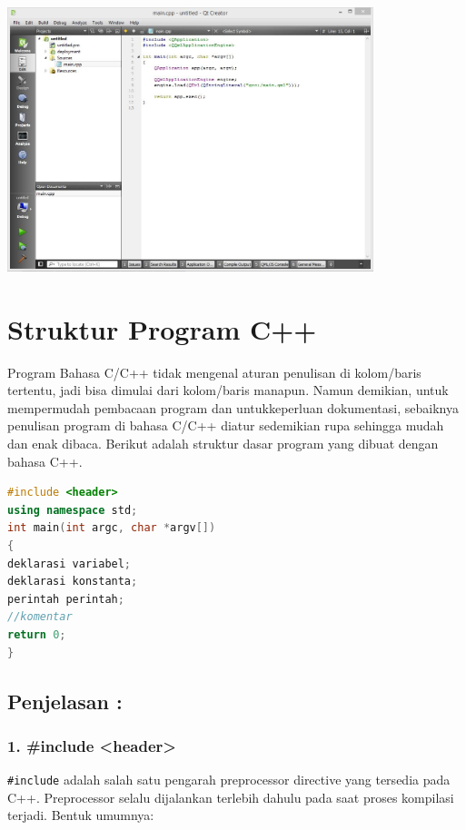 \begin{center}

\includegraphics[width=0.8\textwidth]{../manuscript/images/qt-creator.jpg}

\end{center}

\section{Struktur Program C++}\label{struktur-program-cpp}

Program Bahasa C/C++ tidak mengenal aturan penulisan di kolom/baris
tertentu, jadi bisa dimulai dari kolom/baris manapun. Namun demikian,
untuk mempermudah pembacaan program dan untukkeperluan dokumentasi,
sebaiknya penulisan program di bahasa C/C++ diatur sedemikian rupa
sehingga mudah dan enak dibaca. Berikut adalah struktur dasar program
yang dibuat dengan bahasa C++.

\begin{lstlisting}[language=c++, caption=Struktur Program C++]
#include <header>  
using namespace std;    
int main(int argc, char *argv[])
{  
deklarasi variabel;   
deklarasi konstanta;  
perintah perintah;  
//komentar  
return 0;  
}  
\end{lstlisting}

\subsection*{Penjelasan :}

\subsubsection*{ 1. \#include <header>}

\texttt{\#include} adalah salah satu pengarah preprocessor directive
yang tersedia pada C++. Preprocessor selalu dijalankan terlebih dahulu
pada saat proses kompilasi terjadi. Bentuk umumnya:

